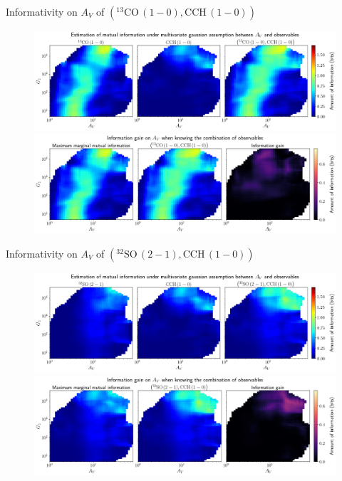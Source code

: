 \documentclass{beamer}
\begin{document}
\begin{frame}{Informativity on $A_V$ of $\left(\mathrm{^{13}CO\,(1-0)},\mathrm{CCH\,(1-0)}\right)$}
    \begin{figure}
        \centering
        \includegraphics[width=0.95\linewidth]{../linearinfo/av__13co10_cch10_linearinfo.png}
        \vfill
        \includegraphics[width=0.95\linewidth]{../linearinfo/av__13co10_cch10_linearinfo_gain.png}
    \end{figure}
\end{frame}

\begin{frame}{Informativity on $A_V$ of $\left(\mathrm{^{32}SO\,(2-1)},\mathrm{CCH\,(1-0)}\right)$}
    \begin{figure}
        \centering
        \includegraphics[width=0.95\linewidth]{../linearinfo/av__32so21_cch10_linearinfo.png}
        \vfill
        \includegraphics[width=0.95\linewidth]{../linearinfo/av__32so21_cch10_linearinfo_gain.png}
    \end{figure}
\end{frame}
\end{document}
